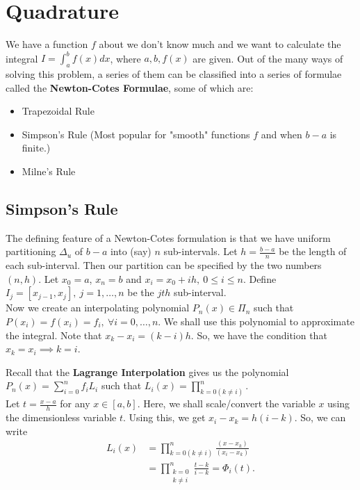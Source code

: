 

\section{Quadrature}

We have a function $f$ about we don't know much and we want to calculate the integral 
$I = \int_a^b f(x) dx$, where  $a,b,f(x)$ are given. Out of the many ways of solving this 
problem, a series of them can be classified into a series of formulae called the 
\textbf{Newton-Cotes Formulae}, some of which are:
\begin{itemize}
    \item Trapezoidal Rule
    \item Simpson's Rule (Most popular for "smooth" functions $f$ and when  $b-a$ is finite.)
    \item Milne's Rule
\end{itemize}

\subsection{Simpson's Rule}

The defining feature of a Newton-Cotes formulation is that we have uniform partitioning 
$\Delta _u$ of  $b-a$ into (say)  $n$ sub-intervals. Let  $h = \frac{b-a}{n}$ be the length of
each sub-interval. Then our partition can be specified by the two numbers $(n,h)$. 
Let $x_0 = a$, $x_n = b$ and  $x_i = x_0 + ih,\ 0 \le  i \le  n$. 
Define $I_j = [x_{j-1}, x_j],\ j = 1,\ldots,n$ be the $jth$ sub-interval.
\\
Now we create an interpolating polynomial $P_n(x) \in \Pi _n$ such that  
$P(x_i) = f(x_i) = f_i,\ \forall i = 0,\ldots,n$. We shall use this polynomial to approximate
the integral.
Note that $x_k - x_i = (k-i)h$. So, we have the condition that $x_k = x_i \implies k = i$.

Recall that the \textbf{Lagrange Interpolation} gives us the polynomial 
$P_n(x) = \sum \limits _{i=0} ^n f_i L_i$ such that $L_i(x) = \prod \limits _{k=0 (k \neq i)} 
^ n$.
\\
Let $t = \frac{x-a}{h}$ for any $ x \in [a,b]$. Here, we shall scale/convert the variable $x$
using the dimensionless variable $t$. Using this, we get $x_i-x_k = h(i-k)$. So, we can write 
\begin{align*}
    L_i(x) &= \prod_{k=0 (k \neq i)}^n \frac{(x-x_k)}{(x_i - x_k)} \\
           &= \prod_{\substack{k=0 \\ k \neq i}}^n \frac{t-k}{i-k} = \Phi _i(t) 
.\end{align*}

